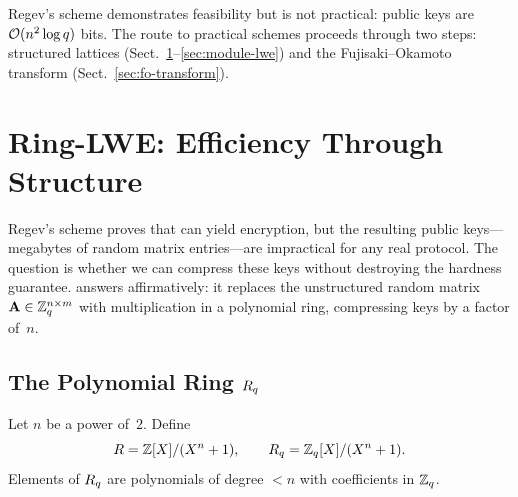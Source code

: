 Regev's scheme demonstrates feasibility but is not practical: public keys are $\mathcal{O}(n^2 \log q)$ bits.  The route to practical schemes proceeds through two steps: structured lattices (Sect.~\ref{sec:ring-lwe}--\ref{sec:module-lwe}) and the Fujisaki--Okamoto transform (Sect.~\ref{sec:fo-transform}).


\section{Ring-LWE: Efficiency Through Structure}
\label{sec:ring-lwe}

Regev's scheme proves that \lwe{} can yield encryption, but the resulting public keys---megabytes of random matrix entries---are impractical for any real protocol.  The question is whether we can compress these keys without destroying the hardness guarantee.  \rlwe{} answers affirmatively: it replaces the unstructured random matrix $\mathbf{A}\in\mathbb{Z}_q^{n\times m}$ with multiplication in a polynomial ring, compressing keys by a factor of~$n$.

\subsection{The Polynomial Ring $R_q$}
\label{subsec:polynomial-ring}

\begin{definition}
\label{def:rq}
Let $n$ be a power of~$2$.  Define
\begin{equation}
R = \mathbb{Z}[X]/(X^n + 1), \qquad R_q = \mathbb{Z}_q[X]/(X^n + 1).
\end{equation}
Elements of $R_q$ are polynomials of degree $< n$ with coefficients in $\mathbb{Z}_q$.
\end{definition}


